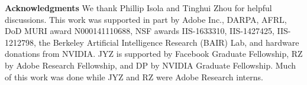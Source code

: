 {\bf Acknowledgments}
\small We thank Phillip Isola and Tinghui Zhou for helpful discussions. 
This work was supported in part by Adobe Inc., DARPA, AFRL, DoD MURI award N000141110688, NSF awards IIS-1633310, IIS-1427425, IIS-1212798, the Berkeley Artificial Intelligence Research (BAIR) Lab, and hardware donations from NVIDIA. JYZ is supported by Facebook Graduate Fellowship, RZ by Adobe Research Fellowship, and DP by NVIDIA Graduate Fellowship. Much of this work was done while JYZ and RZ were Adobe Research interns.
